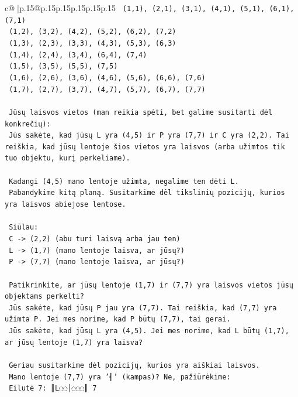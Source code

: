 \documentclass{article}
\begin{document}
{\begin{supertabular}{c@{$\;$}|p{.15\linewidth}@{}p{.15\linewidth}p{.15\linewidth}p{.15\linewidth}p{.15\linewidth}p{.15\linewidth}}
{{{\texttt{   (1,1), (2,1), (3,1), (4,1), (5,1), (6,1), (7,1)} \\
\texttt{   (1,2), (3,2), (4,2), (5,2), (6,2), (7,2)} \\
\texttt{   (1,3), (2,3), (3,3), (4,3), (5,3), (6,3)} \\
\texttt{   (1,4), (2,4), (3,4), (6,4), (7,4)} \\
\texttt{   (1,5), (3,5), (5,5), (7,5)} \\
\texttt{   (1,6), (2,6), (3,6), (4,6), (5,6), (6,6), (7,6)} \\
\texttt{   (1,7), (2,7), (3,7), (4,7), (5,7), (6,7), (7,7)} \\
\\ 
\texttt{   Jūsų laisvos vietos (man reikia spėti, bet galime susitarti dėl konkrečių):} \\
\texttt{   Jūs sakėte, kad jūsų L yra (4,5) ir P yra (7,7) ir C yra (2,2). Tai reiškia, kad jūsų lentoje šios vietos yra laisvos (arba užimtos tik tuo objektu, kurį perkeliame).} \\
\\ 
\texttt{   Kadangi (4,5) mano lentoje užimta, negalime ten dėti L.} \\
\texttt{   Pabandykime kitą planą. Susitarkime dėl tikslinių pozicijų, kurios yra laisvos abiejose lentose.} \\
\\ 
\texttt{   Siūlau:} \\
\texttt{   C {-}> (2,2) (abu turi laisvą arba jau ten)} \\
\texttt{   L {-}> (1,7) (mano lentoje laisva, ar jūsų?)} \\
\texttt{   P {-}> (7,7) (mano lentoje laisva, ar jūsų?)} \\
\\ 
\texttt{   Patikrinkite, ar jūsų lentoje (1,7) ir (7,7) yra laisvos vietos jūsų objektams perkelti?} \\
\texttt{   Jūs sakėte, kad jūsų P jau yra (7,7). Tai reiškia, kad (7,7) yra užimta P. Jei mes norime, kad P būtų (7,7), tai gerai.} \\
\texttt{   Jūs sakėte, kad jūsų L yra (4,5). Jei mes norime, kad L būtų (1,7), ar jūsų lentoje (1,7) yra laisva?} \\
\\ 
\texttt{   Geriau susitarkime dėl pozicijų, kurios yra aiškiai laisvos.} \\
\texttt{   Mano lentoje (7,7) yra '╢' (kampas)? Ne, pažiūrėkime:} \\
\texttt{   Eilutė 7: ║L◌◌│◌◌◌║ 7} \\
}}}
\end{supertabular}}
\end{document}
